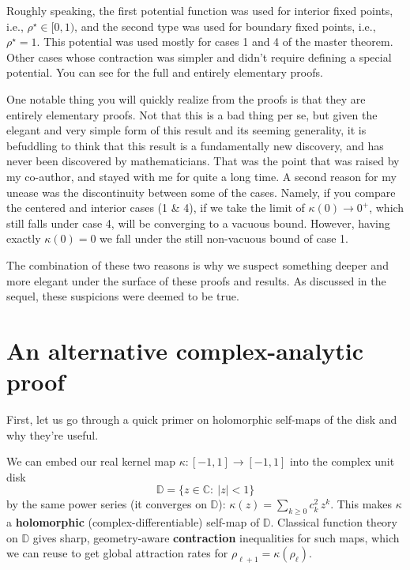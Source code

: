 \documentclass[11pt]{article}
\begin{document}
Roughly speaking, the first potential function was used for interior fixed points, i.e., $\rho^\star\in[0,1)$, and the second type was used for boundary fixed points, i.e., $\rho^\star=1.$ This potential was used mostly for cases 1 and 4 of the master theorem. Other cases whose contraction was simpler and didn't require defining a special potential. You can see \cite{joudaki2025aistats} for the full and entirely elementary proofs.

One notable thing you will quickly realize from the proofs is that they are entirely elementary proofs. Not that this is a bad thing per se, but given the elegant and very simple form of this result and its seeming generality, it is befuddling to think that this result is a fundamentally new discovery, and has never been discovered by mathematicians. That was the point that was raised by my co-author, and stayed with me for quite a long time. A second reason for my unease was the discontinuity between some of the cases. Namely, if you compare the centered and interior cases (1 \& 4), if we take the limit of $\kappa(0)\to 0^+$, which still falls under case 4, will be converging to a vacuous bound. However, having exactly $\kappa(0) = 0$ we fall under the still non-vacuous bound of case 1.

The combination of these two reasons is why we suspect something deeper and more elegant under the surface of these proofs and results. As discussed in the sequel, these suspicions were deemed to be true.

\section{An alternative complex-analytic proof}

First, let us go through a quick primer on holomorphic self-maps of the disk and why they're useful.

We can embed our real kernel map $\kappa:[-1,1]\to[-1,1]$ into the complex unit disk
\begin{equation}
\mathbb{D} = \{z\in\mathbb{C}:\ |z|<1\}
\end{equation}
by the same power series (it converges on $\mathbb{D}$): $\kappa(z)=\sum_{k\geq0}c_k^2\,z^k$. This makes $\kappa$ a \textbf{holomorphic} (complex-differentiable) self-map of $\mathbb{D}$. Classical function theory on $\mathbb{D}$ gives sharp, geometry-aware \textbf{contraction} inequalities for such maps, which we can reuse to get global attraction rates for $\rho_{\ell+1}=\kappa(\rho_\ell)$.
\end{document}

